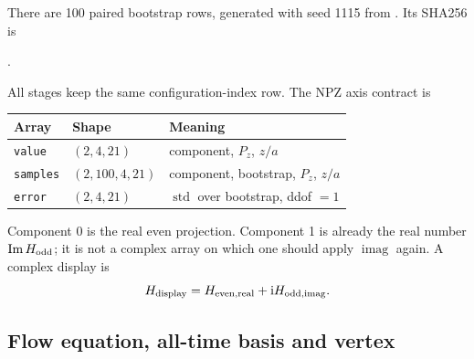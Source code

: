 \documentclass[11pt]{article}
\numberwithin{equation}{section}
\newcommand{\ii}{\mathrm{i}}
\begin{document}
There are 100 paired bootstrap rows, generated with seed 1115 from
.  Its SHA256 is
\begin{center}
.
\end{center}
All stages keep the same configuration-index row.  The NPZ axis contract is
\begin{center}
\begin{tabular}{@{}lll@{}}
\toprule
Array & Shape & Meaning\\
\midrule
\texttt{value} & \((2,4,21)\) & component, \(P_z\), \(z/a\)\\
\texttt{samples} & \((2,100,4,21)\) & component, bootstrap, \(P_z\), \(z/a\)\\
\texttt{error} & \((2,4,21)\) & \(\operatorname{std}\) over bootstrap, ddof \(=1\)\\
\bottomrule
\end{tabular}
\end{center}
Component 0 is the real even projection.  Component 1 is already the real
number \(\operatorname{Im}H_{\rm odd}\); it is not a complex array on which
one should apply \(\operatorname{imag}\) again.  A complex display is
\begin{equation}
 H_{\rm display}=H_{\rm even,real}
                 +\ii H_{\rm odd,imag}.
\label{eq:l32x64-complex-display}
\end{equation}

\subsection{Flow equation, all-time basis and vertex}
\end{document}
